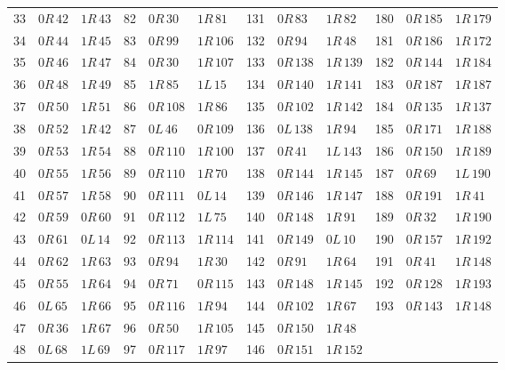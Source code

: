 \begin{longtable}{@{}rll@{\quad}rll@{\quad}rll@{\quad}rll@{}}
33 & $0R\,42$ & $1R\,43$ & 82 & $0R\,30$ & $1R\,81$ & 131 & $0R\,83$ & $1R\,82$ & 180 & $0R\,185$ & $1R\,179$\\
34 & $0R\,44$ & $1R\,45$ & 83 & $0R\,99$ & $1R\,106$ & 132 & $0R\,94$ & $1R\,48$ & 181 & $0R\,186$ & $1R\,172$\\
35 & $0R\,46$ & $1R\,47$ & 84 & $0R\,30$ & $1R\,107$ & 133 & $0R\,138$ & $1R\,139$ & 182 & $0R\,144$ & $1R\,184$\\
36 & $0R\,48$ & $1R\,49$ & 85 & $1R\,85$ & $1L\,15$ & 134 & $0R\,140$ & $1R\,141$ & 183 & $0R\,187$ & $1R\,187$\\
37 & $0R\,50$ & $1R\,51$ & 86 & $0R\,108$ & $1R\,86$ & 135 & $0R\,102$ & $1R\,142$ & 184 & $0R\,135$ & $1R\,137$\\
38 & $0R\,52$ & $1R\,42$ & 87 & $0L\,46$ & $0R\,109$ & 136 & $0L\,138$ & $1R\,94$ & 185 & $0R\,171$ & $1R\,188$\\
39 & $0R\,53$ & $1R\,54$ & 88 & $0R\,110$ & $1R\,100$ & 137 & $0R\,41$ & $1L\,143$ & 186 & $0R\,150$ & $1R\,189$\\
40 & $0R\,55$ & $1R\,56$ & 89 & $0R\,110$ & $1R\,70$ & 138 & $0R\,144$ & $1R\,145$ & 187 & $0R\,69$ & $1L\,190$\\
41 & $0R\,57$ & $1R\,58$ & 90 & $0R\,111$ & $0L\,14$ & 139 & $0R\,146$ & $1R\,147$ & 188 & $0R\,191$ & $1R\,41$\\
42 & $0R\,59$ & $0R\,60$ & 91 & $0R\,112$ & $1L\,75$ & 140 & $0R\,148$ & $1R\,91$ & 189 & $0R\,32$ & $1R\,190$\\
43 & $0R\,61$ & $0L\,14$ & 92 & $0R\,113$ & $1R\,114$ & 141 & $0R\,149$ & $0L\,10$ & 190 & $0R\,157$ & $1R\,192$\\
44 & $0R\,62$ & $1R\,63$ & 93 & $0R\,94$ & $1R\,30$ & 142 & $0R\,91$ & $1R\,64$ & 191 & $0R\,41$ & $1R\,148$\\
45 & $0R\,55$ & $1R\,64$ & 94 & $0R\,71$ & $0R\,115$ & 143 & $0R\,148$ & $1R\,145$ & 192 & $0R\,128$ & $1R\,193$\\
46 & $0L\,65$ & $1R\,66$ & 95 & $0R\,116$ & $1R\,94$ & 144 & $0R\,102$ & $1R\,67$ & 193 & $0R\,143$ & $1R\,148$\\
47 & $0R\,36$ & $1R\,67$ & 96 & $0R\,50$ & $1R\,105$ & 145 & $0R\,150$ & $1R\,48$ &  &  & \\
48 & $0L\,68$ & $1L\,69$ & 97 & $0R\,117$ & $1R\,97$ & 146 & $0R\,151$ & $1R\,152$ &  &  & \\
\bottomrule
\end{longtable}
